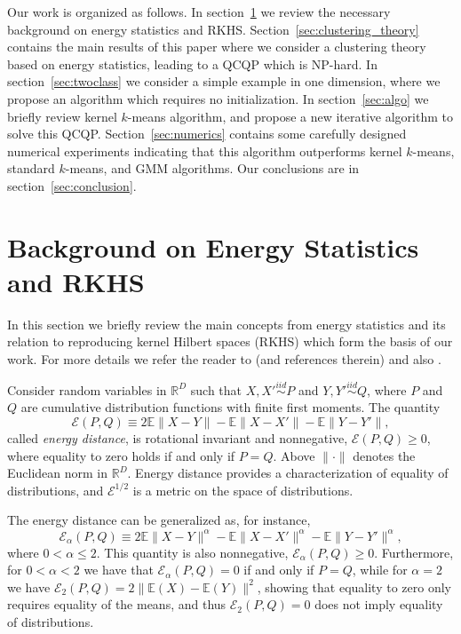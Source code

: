 \documentclass[aps,preprint,nofootinbib,floatfix]{revtex4-1}
\newcommand\Energy{\mathcal{E}}
\newcommand\E{\mathbb{E}}
\begin{document}
Our work is organized as follows. In section~\ref{sec:background} we review
the necessary background on energy statistics and RKHS.
Section~\ref{sec:clustering_theory} contains the main results of this paper
where we consider a clustering theory based on energy statistics, leading
to a QCQP which is NP-hard.
In section~\ref{sec:twoclass} we consider a simple example in one dimension,
where we propose an algorithm which requires no initialization.
In section~\ref{sec:algo} we briefly review kernel $k$-means algorithm,
and propose a new iterative algorithm to solve this QCQP.
Section~\ref{sec:numerics} contains some carefully designed numerical
experiments indicating that this algorithm outperforms kernel
$k$-means, standard $k$-means, and GMM algorithms.
Our conclusions are in section~\ref{sec:conclusion}.



\section{Background on Energy Statistics and RKHS}
\label{sec:background}

In this section we briefly review the main concepts from energy
statistics and its relation to reproducing kernel Hilbert spaces 
(RKHS) which form the basis of our work.
For more details we refer the reader
to \cite{Szkely2013} (and references therein) and 
also \cite{Sejdinovic2013}.

Consider random variables in $\mathbb{R}^D$ 
such that $X,X' \stackrel{iid}{\sim} P$ and 
$Y,Y' \stackrel{iid}{\sim} Q$, where $P$ and $Q$ are cumulative
distribution functions with finite first moments. 
The quantity \cite{Szkely2013}
\begin{equation}
\label{eq:energy}
\Energy(P, Q) \equiv 2 \E \| X - Y\| - \E \| X - X' \| - \E \| Y - Y' \|,
\end{equation}
called \emph{energy distance}, 
is rotational invariant and nonnegative, $\Energy(P,Q) \ge 0$, where
equality
to zero holds if and only if $P = Q$.
Above $\| \cdot \|$ denotes the
Euclidean norm in $\mathbb{R}^D$. 
Energy distance
provides a characterization of equality of distributions, and
$\Energy^{1/2}$ is
a metric on the space of distributions.

The energy distance can be generalized as, for instance,
\begin{equation}
\label{eq:energy2}
\Energy_\alpha(P, Q) \equiv 
2 \E \| X - Y\|^{\alpha} - \E \| X - X' \|^{\alpha} - 
\E \| Y - Y' \|^{\alpha},
\end{equation}
where $0<\alpha\le 2$. This quantity is also nonnegative,
$\Energy_\alpha(P,Q) \ge 0$. Furthermore, for $0<\alpha<2$ we have that
$\Energy_\alpha(P,Q) = 0$ if and only if $P=Q$, while for $\alpha=2$ 
we have $\Energy_2(P,Q) = 2\| \E(X) - \E(Y) \|^2$, showing that
equality to zero only requires
equality of the means, and thus $\Energy_2(P,Q)=0$ does 
not imply equality of distributions.
\end{document}
